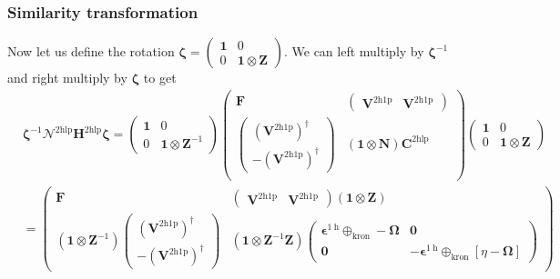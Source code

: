 \subsubsection{Similarity transformation}
 Now let us define the rotation $\bm{\zeta} = \begin{pmatrix} \bm{1} & 0 \\ 0& \bm{1} \otimes \bm{Z} \end{pmatrix}$. We can left multiply by $\bm{\zeta}^{-1}$ and right multiply by $\bm{\zeta}$ to get
\begin{align}
    &\bm{\zeta}^{-1} \bm{\mathcal{N}}^{2 \mathrm{hlp}} \bm{H}^{2 \mathrm{hlp}} \bm{\zeta} = \begin{pmatrix}
\bm{1} & 0 \\
0 & \bm{1} \otimes \bm{Z}^{-1}
\end{pmatrix}
\begin{pmatrix}
\bm{F} & \begin{pmatrix} \bm{V}^{2\mathrm{h1p}} & \bm{V}^{2\mathrm{h1p}}\end{pmatrix} \\
\begin{pmatrix} \left(\bm{V}^{2\mathrm{h1p}}\right)^{\dagger} \\ -\left( \bm{V}^{2\mathrm{h1p}}\right)^{\dagger} \end{pmatrix} &   \left( \bm{1} \otimes \bm{N} \right) \bm{C}^{2\mathrm{hlp}}  \\
\end{pmatrix}
 \begin{pmatrix}\bm{1} & 0 \\
0 & \bm{1} \otimes \bm{Z}
\end{pmatrix} \\
&= \begin{pmatrix}\bm{F} & \begin{pmatrix} \bm{V}^{2\mathrm{h1p}} & \bm{V}^{2\mathrm{h1p}}\end{pmatrix} \left(\bm{1} \otimes \bm{Z}\right) \\
\left(\bm{1} \otimes \bm{Z}^{-1}\right) \begin{pmatrix} \left(\bm{V}^{2\mathrm{h1p}}\right)^{\dagger} \\ -\left( \bm{V}^{2\mathrm{h1p}}\right)^{\dagger} \end{pmatrix} &   \left( \bm{1} \otimes \bm{Z}^{-1} \bm{Z} \right) \begin{pmatrix}
\bm{\epsilon}^{1 \mathrm{~h}} \oplus_{\text{kron}} -\bm{\Omega} & \bm{0} \\
\bm{0} & -\bm{\epsilon}^{1 \mathrm{~h}}\oplus_{\text{kron}}\left[\eta -\bm{\Omega}\right]

\end{pmatrix}
\end{pmatrix}
\end{align}
